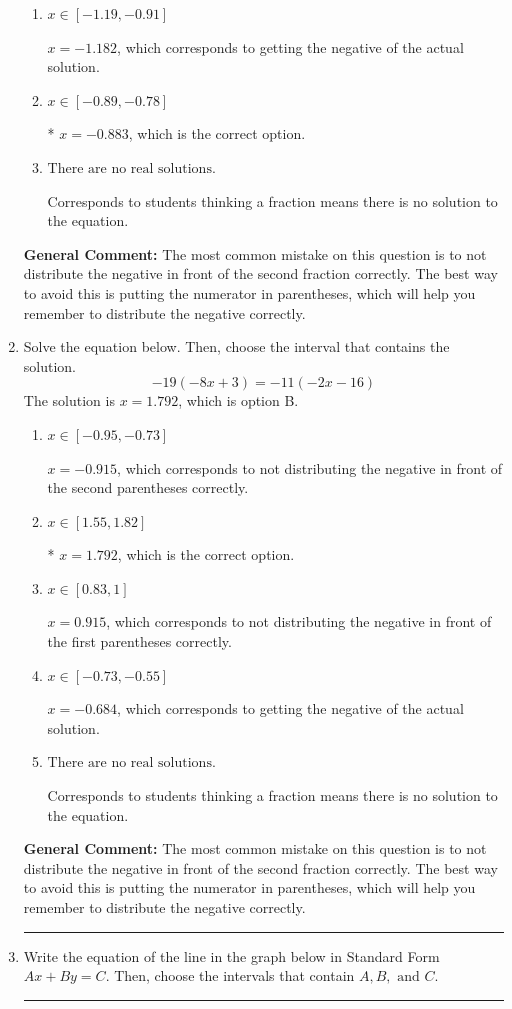 \documentclass{extbook}[14pt]
\newcommand{\litem}[1]{\item #1

\rule{\textwidth}{0.4pt}}
\begin{document}
\begin{enumerate}
{\begin{enumerate}[label=\Alph*.]
$x = 2.026$, which corresponds to not distributing the negative in front of the second parentheses correctly.
\item \( x \in [-1.19, -0.91] \)

$x = -1.182$, which corresponds to getting the negative of the actual solution.
\item \( x \in [-0.89, -0.78] \)

* $x = -0.883$, which is the correct option.
\item \( \text{There are no real solutions.} \)

Corresponds to students thinking a fraction means there is no solution to the equation.
\end{enumerate}

\textbf{General Comment:} The most common mistake on this question is to not distribute the negative in front of the second fraction correctly. The best way to avoid this is putting the numerator in parentheses, which will help you remember to distribute the negative correctly.
}
\litem{
Solve the equation below. Then, choose the interval that contains the solution.
\[ -19(-8x + 3) = -11(-2x -16) \]The solution is \( x = 1.792 \), which is option B.\begin{enumerate}[label=\Alph*.]
\item \( x \in [-0.95, -0.73] \)

$x = -0.915$, which corresponds to not distributing the negative in front of the second parentheses correctly.
\item \( x \in [1.55, 1.82] \)

* $x = 1.792$, which is the correct option.
\item \( x \in [0.83, 1] \)

$x = 0.915$, which corresponds to not distributing the negative in front of the first parentheses correctly.
\item \( x \in [-0.73, -0.55] \)

$x = -0.684$, which corresponds to getting the negative of the actual solution.
\item \( \text{There are no real solutions.} \)

Corresponds to students thinking a fraction means there is no solution to the equation.
\end{enumerate}

\textbf{General Comment:} The most common mistake on this question is to not distribute the negative in front of the second fraction correctly. The best way to avoid this is putting the numerator in parentheses, which will help you remember to distribute the negative correctly.
}
\litem{
Write the equation of the line in the graph below in Standard Form $Ax+By=C$. Then, choose the intervals that contain $A, B, \text{ and } C$.

}
\end{enumerate}
\end{document}
